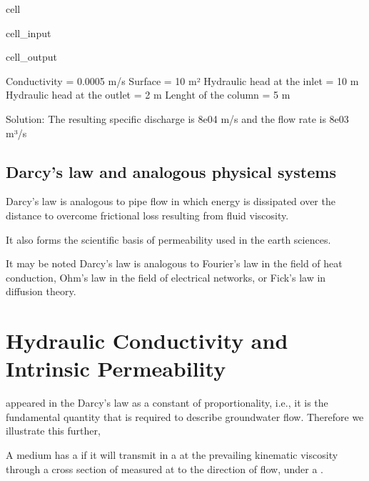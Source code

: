 \documentclass[letterpaper,10pt,english]{jupyterBook}
\begin{document}
\begin{sphinxuseclass}{cell}
\begin{sphinxVerbatimInput}
\begin{sphinxuseclass}{cell_input}
\end{sphinxuseclass}\end{sphinxVerbatimInput}
\begin{sphinxVerbatimOutput}

\begin{sphinxuseclass}{cell_output}
\begin{sphinxVerbatim}[commandchars=\\\{\}]
Conductivity = 0.0005 m/s
Surface = 10 m²
Hydraulic head at the inlet = 10 m
Hydraulic head at the outlet = 2 m
Lenght of the column = 5 m 

Solution:
The resulting specific discharge is 8e\PYGZhy{}04 m/s 
and the flow rate is 8e\PYGZhy{}03 m³/s
\end{sphinxVerbatim}

\end{sphinxuseclass}\end{sphinxVerbatimOutput}

\end{sphinxuseclass}

\subsection{Darcy’s law and analogous physical systems}
\label{\detokenize{content/flow/L4/14_darcy_law_K:darcy-s-law-and-analogous-physical-systems}}
\sphinxAtStartPar
Darcy’s law is analogous to pipe flow in which energy is dissipated over the distance to overcome frictional loss resulting
from fluid viscosity.

\sphinxAtStartPar
It also forms the scientific basis of permeability used in the earth
sciences.

\sphinxAtStartPar
It may be noted Darcy’s law is analogous to Fourier’s law in the field of heat conduction, Ohm’s law in the field of electrical networks, or Fick’s law in diffusion theory.


\section{Hydraulic Conductivity and Intrinsic Permeability}
\label{\detokenize{content/flow/L4/14_darcy_law_K:hydraulic-conductivity-and-intrinsic-permeability}}
\sphinxAtStartPar
{} appeared in the Darcy’s law as a constant of proportionality, i.e., it is the fundamental quantity that is required to describe groundwater flow. Therefore we illustrate this further,

\sphinxAtStartPar
A medium has a  if it will transmit in  a  at the prevailing kinematic viscosity through a cross section of  measured at  to the direction of flow, under a .
\end{document}
